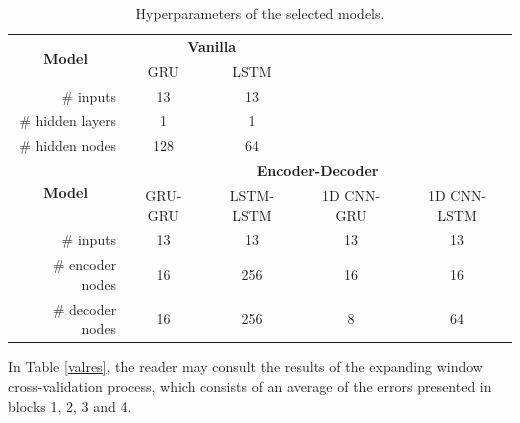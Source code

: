 \begin{table}[htbp]
  \centering
  \caption{Hyperparameters of the selected models.}
    \begin{tabular}{r|cccc}
    \multicolumn{1}{c|}{\multirow{2}[1]{*}{\textbf{Model}}} & \multicolumn{2}{c}{\textbf{Vanilla}} &   &  \\
      & GRU & LSTM &   &  \\
\cmidrule{1-3}    \# inputs & 13 & 13 &   &  \\
    \# hidden layers & 1 & 1 &   &  \\
    \# hidden nodes & 128 & 64 &   &  \\
    \midrule
    \multicolumn{1}{c|}{\multirow{2}[2]{*}{\textbf{Model}}} & \multicolumn{4}{c}{\textbf{Encoder-Decoder}} \\
      & GRU-GRU & LSTM-LSTM & 1D CNN-GRU & 1D CNN-LSTM \\
    \midrule
    \# inputs & 13 & 13 & 13 & 13 \\
    \# encoder nodes & 16 & 256 & 16 & 16 \\
    \# decoder nodes & 16 & 256 & 8 & 64 \\
    \end{tabular}%
  \label{tab:characteristics}%
\end{table}%





In Table \ref{valres}, the reader may consult the results of the expanding window cross-validation process, which consists of an average of the errors presented in blocks 1, 2, 3 and 4.


